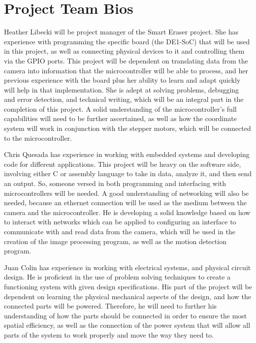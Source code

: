 \documentclass[10pt,onecolumn,draftcls]{IEEEtran} 					%
\begin{document}
	\section{Project Team Bios}
	\setlength{\parindent}{5ex}
	Heather Libecki will be project manager of the Smart Eraser project. She has experience with programming the specific board (the DE1-SoC) that will be used in this project, as well as connecting physical devices to it and controlling them via the GPIO ports. This project will be dependent on translating data from the camera into information that the microcontroller will be able to process, and her previous experience with the board plus her ability to learn and adapt quickly will help in that implementation. She is adept at solving problems, debugging and error detection, and technical writing, which will be an integral part in the completion of this project. A solid understanding of the microcontroller{\rq}s full capabilities will need to be further ascertained, as well as how the coordinate system will work in conjunction with the stepper motors, which will be connected to the microcontroller.\par
	\setlength{\parindent}{5ex}	
	Chris Quesada has experience in working with embedded systems and developing code for different applications. This project will be heavy on the software side, involving either C or assembly language to take in data, analyze it, and then send an output. So, someone versed in both programming and interfacing with microcontrollers will be needed. A good understanding of networking will also be needed, because an ethernet connection will be used as the medium between the camera and the microcontroller. He is developing a solid knowledge based on how to interact with networks which can be applied to configuring an interface to communicate with and read data from the camera, which will be used in the creation of the image processing program, as well as the motion detection program.\par
	\setlength{\parindent}{5ex}	
	Juan Colin has experience in working with electrical systems, and physical circuit design. He is proficient in the use of problem solving techniques to create a functioning system with given design specifications. His part of the project will be dependent on learning the physical mechanical aspects of the design, and how the connected parts will be powered. Therefore, he will need to further his understanding of how the parts should be connected in order to ensure the most spatial efficiency, as well as the connection of the power system that will allow all parts of the system to work properly and move the way they need to. 
\end{document}
